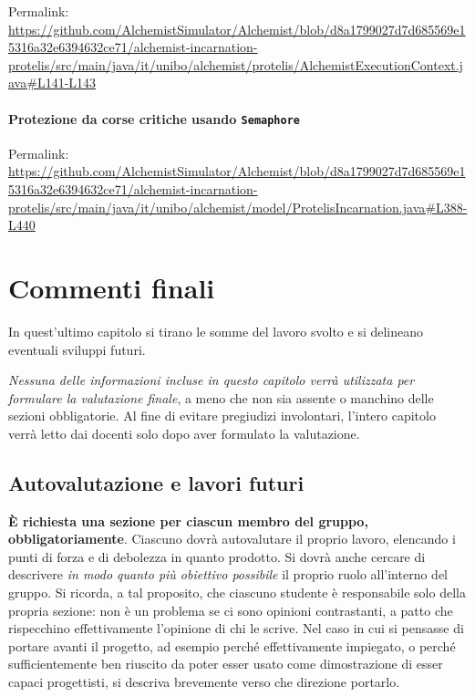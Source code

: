 \documentclass[a4paper,12pt]{report}
\begin{document}
Permalink: \url{https://github.com/AlchemistSimulator/Alchemist/blob/d8a1799027d7d685569e15316a32e6394632ce71/alchemist-incarnation-protelis/src/main/java/it/unibo/alchemist/protelis/AlchemistExecutionContext.java#L141-L143}

\subsubsection{Protezione da corse critiche usando \texttt{Semaphore}}

Permalink: \url{https://github.com/AlchemistSimulator/Alchemist/blob/d8a1799027d7d685569e15316a32e6394632ce71/alchemist-incarnation-protelis/src/main/java/it/unibo/alchemist/model/ProtelisIncarnation.java#L388-L440}


\chapter{Commenti finali}

In quest'ultimo capitolo si tirano le somme del lavoro svolto e si delineano eventuali sviluppi
futuri.

\textit{Nessuna delle informazioni incluse in questo capitolo verrà utilizzata per formulare la valutazione finale}, a meno che non sia assente o manchino delle sezioni obbligatorie.
%
Al fine di evitare pregiudizi involontari, l'intero capitolo verrà letto dai docenti solo dopo aver formulato la valutazione.

\section{Autovalutazione e lavori futuri}

\textbf{È richiesta una sezione per ciascun membro del gruppo, obbligatoriamente}.
%
Ciascuno dovrà autovalutare il proprio lavoro, elencando i punti di forza e di debolezza in quanto prodotto.
Si dovrà anche cercare di descrivere \emph{in modo quanto più obiettivo possibile} il proprio ruolo all'interno del gruppo.
Si ricorda, a tal proposito, che ciascuno studente è responsabile solo della propria sezione: non è un problema se ci sono opinioni contrastanti, a patto che rispecchino effettivamente l'opinione di chi le scrive.
Nel caso in cui si pensasse di portare avanti il progetto, ad esempio perché effettivamente impiegato, o perché sufficientemente ben riuscito da poter esser usato come dimostrazione di esser capaci progettisti, si descriva brevemente verso che direzione portarlo.
\end{document}

